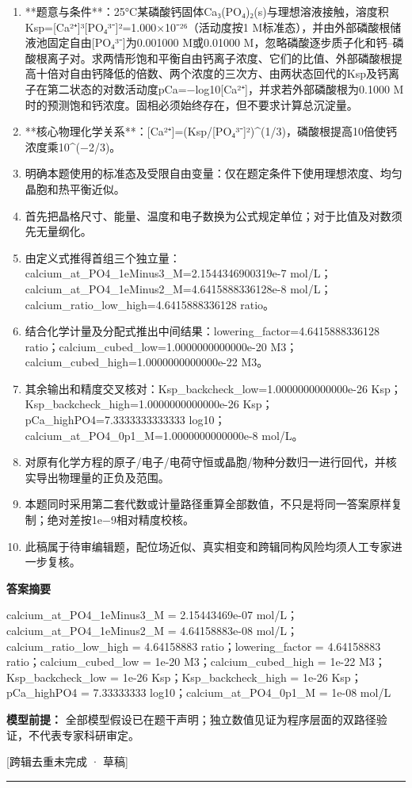 \documentclass[UTF8,11pt,a4paper]{ctexart}
\begin{document}
\begin{enumerate}
\item **题意与条件**：25°C某磷酸钙固体Ca₃(PO₄)₂(s)与理想溶液接触，溶度积Ksp=[Ca²⁺]³[PO₄³⁻]²=1.000×10⁻²⁶（活动度按1 M标准态），并由外部磷酸根储液池固定自由[PO₄³⁻]为0.001000 M或0.01000 M，忽略磷酸逐步质子化和钙–磷酸根离子对。求两情形饱和平衡自由钙离子浓度、它们的比值、外部磷酸根提高十倍对自由钙降低的倍数、两个浓度的三次方、由两状态回代的Ksp及钙离子在第二状态的对数活动度pCa=−log10[Ca²⁺]，并求若外部磷酸根为0.1000 M时的预测饱和钙浓度。固相必须始终存在，但不要求计算总沉淀量。
\item **核心物理化学关系**：[Ca²⁺]=(Ksp/[PO₄³⁻]²)\textasciicircum{}(1/3)，磷酸根提高10倍使钙浓度乘10\textasciicircum{}(−2/3)。
\item 明确本题使用的标准态及受限自由变量：仅在题定条件下使用理想浓度、均匀晶胞和热平衡近似。
\item 首先把晶格尺寸、能量、温度和电子数换为公式规定单位；对于比值及对数须先无量纲化。
\item 由定义式推得首组三个独立量：calcium\_at\_PO4\_1eMinus3\_M=2.1544346900319e-7 mol/L；calcium\_at\_PO4\_1eMinus2\_M=4.6415888336128e-8 mol/L；calcium\_ratio\_low\_high=4.6415888336128 ratio。
\item 结合化学计量及分配式推出中间结果：lowering\_factor=4.6415888336128 ratio；calcium\_cubed\_low=1.0000000000000e-20 M3；calcium\_cubed\_high=1.0000000000000e-22 M3。
\item 其余输出和精度交叉核对：Ksp\_backcheck\_low=1.0000000000000e-26 Ksp；Ksp\_backcheck\_high=1.0000000000000e-26 Ksp；pCa\_highPO4=7.3333333333333 log10；calcium\_at\_PO4\_0p1\_M=1.0000000000000e-8 mol/L。
\item 对原有化学方程的原子/电子/电荷守恒或晶胞/物种分数归一进行回代，并核实导出物理量的正负及范围。
\item 本题同时采用第二套代数或计量路径重算全部数值，不只是将同一答案原样复制；绝对差按1e−9相对精度校核。
\item 此稿属于待审编辑题，配位场近似、真实相变和跨辑同构风险均须人工专家进一步复核。
\end{enumerate}
\noindent\textbf{答案摘要}\par
calcium\_at\_PO4\_1eMinus3\_M = 2.15443469e-07 mol/L；calcium\_at\_PO4\_1eMinus2\_M = 4.64158883e-08 mol/L；calcium\_ratio\_low\_high = 4.64158883 ratio；lowering\_factor = 4.64158883 ratio；calcium\_cubed\_low = 1e-20 M3；calcium\_cubed\_high = 1e-22 M3；Ksp\_backcheck\_low = 1e-26 Ksp；Ksp\_backcheck\_high = 1e-26 Ksp；pCa\_highPO4 = 7.33333333 log10；calcium\_at\_PO4\_0p1\_M = 1e-08 mol/L\par
\noindent\textbf{模型前提：}
全部模型假设已在题干声明；独立数值见证为程序层面的双路径验证，不代表专家科研审定。\par
\noindent\textcolor{red!65!black}{[跨辑去重未完成 · 草稿]} \par
\medskip\hrule\medskip
{}
\end{document}
